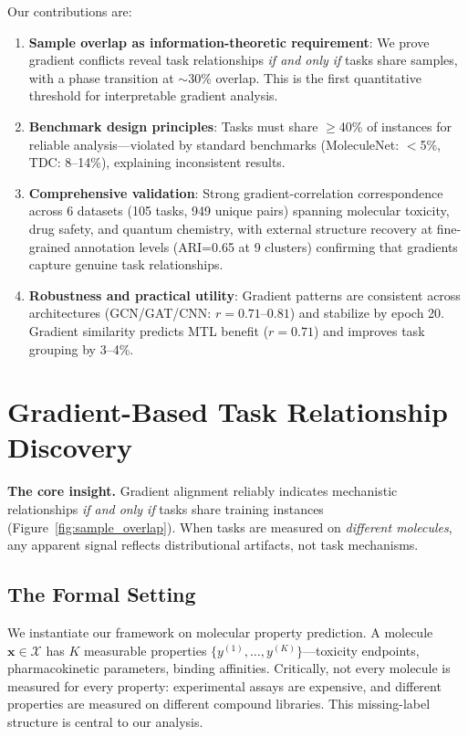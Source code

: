\documentclass{article}
\begin{document}
Our contributions are:
\begin{enumerate}
\item \textbf{Sample overlap as information-theoretic requirement}: We prove gradient conflicts reveal task relationships \textit{if and only if} tasks share samples, with a phase transition at $\sim$30\% overlap. This is the first quantitative threshold for interpretable gradient analysis.

\item \textbf{Benchmark design principles}: Tasks must share $\geq$40\% of instances for reliable analysis---violated by standard benchmarks (MoleculeNet: $<$5\%, TDC: 8--14\%), explaining inconsistent results.

\item \textbf{Comprehensive validation}: Strong gradient-correlation correspondence across 6 datasets (105 tasks, 949 unique pairs) spanning molecular toxicity, drug safety, and quantum chemistry, with external structure recovery at fine-grained annotation levels (ARI=0.65 at 9 clusters) confirming that gradients capture genuine task relationships.

\item \textbf{Robustness and practical utility}: Gradient patterns are consistent across architectures (GCN/GAT/CNN: $r=0.71$--$0.81$) and stabilize by epoch 20. Gradient similarity predicts MTL benefit ($r = 0.71$) and improves task grouping by 3--4\%.
\end{enumerate}

\section{Gradient-Based Task Relationship Discovery}

\textbf{The core insight.} Gradient alignment reliably indicates mechanistic relationships \textit{if and only if} tasks share training instances (Figure~\ref{fig:sample_overlap}). When tasks are measured on \textit{different molecules}, any apparent signal reflects distributional artifacts, not task mechanisms.

\subsection{The Formal Setting}

We instantiate our framework on molecular property prediction. A molecule $\mathbf{x} \in \mathcal{X}$ has $K$ measurable properties $\{y^{(1)}, \ldots, y^{(K)}\}$---toxicity endpoints, pharmacokinetic parameters, binding affinities. Critically, not every molecule is measured for every property: experimental assays are expensive, and different properties are measured on different compound libraries. This missing-label structure is central to our analysis.
\end{document}
